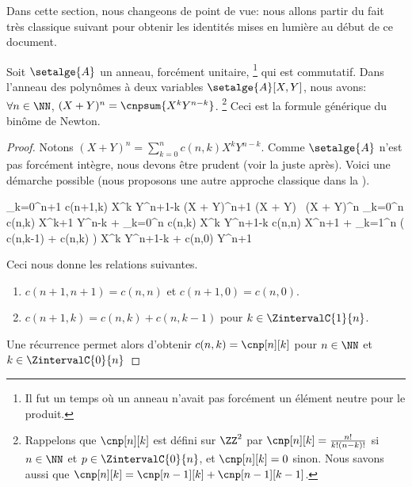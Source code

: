 Dans cette section, nous changeons de point de vue: nous allons partir du fait très classique suivant pour obtenir les identités mises en lumière au début de ce document.




\begin{fact} \label{bino-id-formal}
	Soit $\setalge{A}$ un anneau, forcément unitaire,%
	\footnote{
        Il fut un temps où un anneau n'avait pas forcément un élément neutre pour le produit.
	}
	qui est commutatif.
	Dans l'anneau des polynômes à deux variables $\setalge{A}[X, Y]$, nous avons:
	$\forall n \in \NN$,
	$(X + Y)^n = \cnpsum{X^k Y^{n-k}}$.%
	\footnote{
        Rappelons que $\cnp[n][k]$ est défini sur $\ZZ^2$ par
        $\cnp[n][k] = \frac{n!}{k!(n-k)!}$ si $n \in \NN$ et $p \in \ZintervalC{0}{n}$,
        et
        $\cnp[n][k] = 0$ sinon.
        Nous savons aussi que $\cnp[n][k] = \cnp[n-1][k] + \cnp[n-1][k-1]$.
	}
	Ceci est la formule générique du binôme de Newton.
\end{fact}


\begin{proof}
    Notons $(X + Y)^n = \sum_{k=0}^{n} c(n,k) X^k Y^{n-k}$. Comme $\setalge{A}$ n'est pas forcément intègre, nous devons être prudent (voir la  juste après). Voici une démarche possible (nous proposons une autre approche classique dans la ).%

    \begin{stepcalc}[style=ar*]
    	\dsum_{k=0}^{n+1} c(n+1,k) X^k Y^{n+1-k}
	\explnext{}
		(X + Y)^{n+1}
	\explnext{}
		(X + Y) \, (X + Y)^n
	\explnext{}
		  \dsum_{k=0}^{n} c(n,k) X^{k+1} Y^{n-k}
		+ \dsum_{k=0}^{n} c(n,k) X^k     Y^{n+1-k}
	\explnext{}
		  c(n,n) X^{n+1}
		+ \dsum_{k=1}^{n} \big( c(n,k-1) + c(n,k) \big) X^{k} Y^{n+1-k}
		+ c(n,0) Y^{n+1}
    \end{stepcalc}
    
    Ceci nous donne les relations suivantes.
    \begin{enumerate}
    	\item $c(n+1,n+1) = c(n,n)$ et $c(n+1,0) = c(n,0)$.

    	\item $c(n+1,k) = c(n,k) + c(n,k-1)$ pour $k \in \ZintervalC{1}{n}$.
    \end{enumerate}
    
    Une récurrence permet alors d'obtenir
    $c(n,k) = \cnp[n][k]$ pour $n \in \NN$ et $k \in \ZintervalC{0}{n}$
\end{proof}


